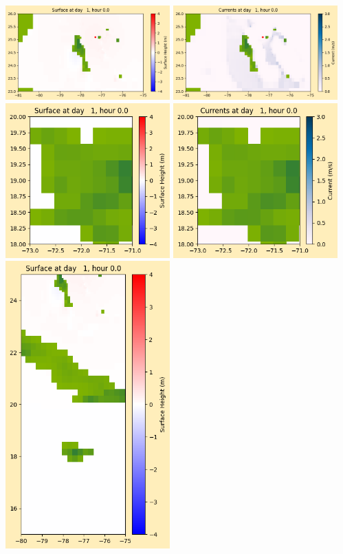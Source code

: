 \documentclass[11pt]{article}
\begin{document}
\vskip 10pt 
\includegraphics[width=0.475\textwidth]{frame0016fig1003.png}
\includegraphics[width=0.475\textwidth]{frame0016fig1004.png}
\vskip 10pt 
\includegraphics[width=0.475\textwidth]{frame0016fig1005.png}
\includegraphics[width=0.475\textwidth]{frame0016fig1006.png}
\vskip 10pt 
\includegraphics[width=0.475\textwidth]{frame0016fig1007.png}
\end{document}
